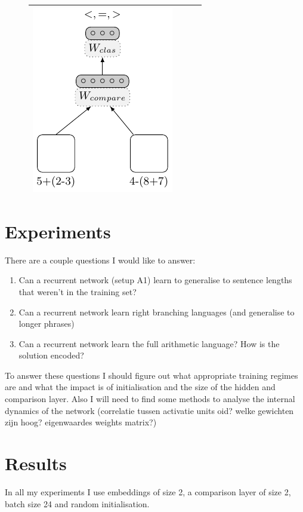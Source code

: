 \documentclass{article}
\begin{document}
\begin{figure}[!ht]
\begin{tabular}{|cccc|}
    \includegraphics[scale=0.9]{A4}\\
\hline
\end{tabular}
\end{figure}


\section{Experiments}

There are a couple questions I would like to answer:\begin{enumerate}
\item Can a recurrent network (setup A1) learn to generalise to sentence lengths that weren't in the training set?
\item Can a recurrent network learn right branching languages (and generalise to longer phrases)
\item Can a recurrent network learn the full arithmetic language? How is the solution encoded?
\end{enumerate}

To answer these questions I should figure out what appropriate training regimes are and what the impact is of initialisation and the size of the hidden and comparison layer. Also I will need to find some methods to analyse the internal dynamics of the network (correlatie tussen activatie units oid? welke gewichten zijn hoog? eigenwaardes weights matrix?)

\section{Results}

In all my experiments I use embeddings of size 2, a comparison layer of size 2, batch size 24 and random initialisation.\\
\end{document}
